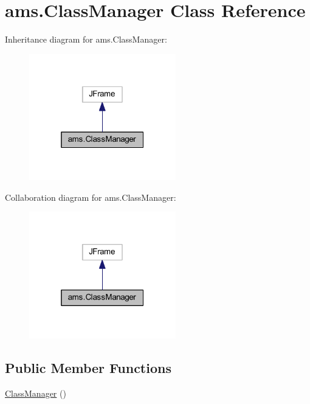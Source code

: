 \hypertarget{classams_1_1_class_manager}{}\section{ams.\+Class\+Manager Class Reference}
\label{classams_1_1_class_manager}


Inheritance diagram for ams.\+Class\+Manager\+:\nopagebreak
\begin{figure}[H]
\begin{center}
\leavevmode
\includegraphics[width=181pt]{classams_1_1_class_manager__inherit__graph}
\end{center}
\end{figure}


Collaboration diagram for ams.\+Class\+Manager\+:\nopagebreak
\begin{figure}[H]
\begin{center}
\leavevmode
\includegraphics[width=181pt]{classams_1_1_class_manager__coll__graph}
\end{center}
\end{figure}
\subsection*{Public Member Functions}
\begin{DoxyCompactItemize}
\item 
\mbox{\hyperlink{classams_1_1_class_manager_a3b26f0eba3ed4f3c02d2e2bf1733863f}{Class\+Manager}} ()
\end{DoxyCompactItemize}
